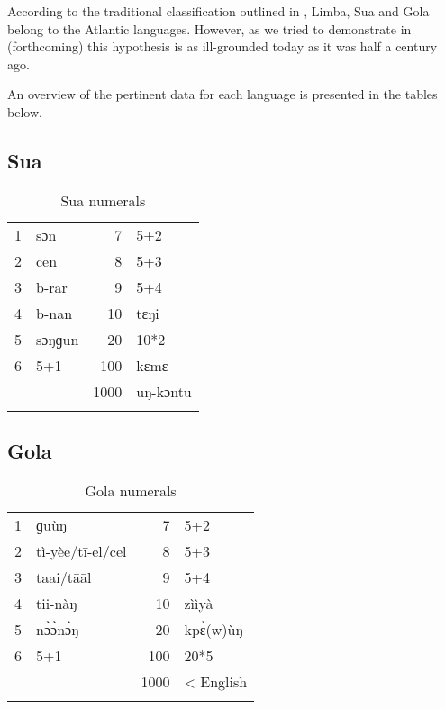 According to the traditional classification outlined in \citealt{Sapir1971}, Limba, Sua and Gola belong to the Atlantic languages. However, as we tried to demonstrate in \citealt{PozdniakovSegerer2017} (forthcoming) this hypothesis is as ill-grounded today as it was half a century ago. 

An overview of the pertinent data for each language is presented in the tables below.


\subsection{Sua}%
\begin{table}
\caption{\label{tab:3:248}Sua numerals}


\begin{tabularx}{\textwidth}{lQrQ}
\lsptoprule

1 & sɔn & 7 & 5+2\\
2 & cen & 8 & 5+3\\
3 & b-rar & 9 & 5+4\\
4 & b-nan & 10 & tɛŋi\\
5 & sɔŋɡun & 20 & 10*2\\
6 & 5+1 & 100 & kɛmɛ\\
&  & 1000 & uŋ-kɔntu\\
\lspbottomrule
\end{tabularx}
\end{table}


\subsection{Gola}%
\begin{table}
\caption{\label{tab:3:249}Gola numerals}


\begin{tabularx}{\textwidth}{lQrQ}
\lsptoprule

1 & ɡu{\`{u}}ŋ & 7 & 5+2\\
2 & tì-yèe/t{\={i}}-el/cel & 8 & 5+3\\
3 & taai/t{\={a}}{\={a}}l & 9 & 5+4\\
4 & tii-nàŋ & 10 & zììyà\\
5 & n{\`{ɔ}}{\`{ɔ}}n{\`{ɔ}}ŋ & 20 & kp{\`{ɛ}}(w){\`{u}}ŋ\\
6 & 5+1 & 100 & 20*5\\
&  & 1000 & < English\\
\lspbottomrule
\end{tabularx}
\end{table}

